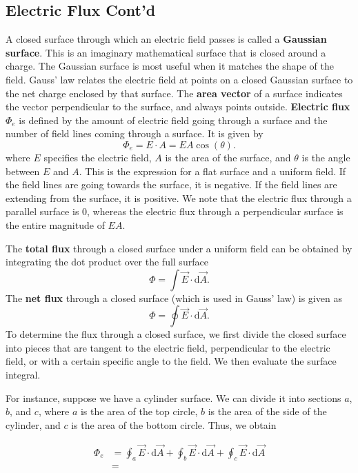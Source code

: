 \documentclass[11pt]{article}
\theoremstyle{plain} %
\theoremstyle{definition}
\theoremstyle{example}
\theoremstyle{remark}
\begin{document}
\subsection{Electric Flux Cont'd}



A closed surface through which an electric field passes is called a \textbf{Gaussian surface}. This is an imaginary mathematical surface that is closed around a charge. The Gaussian surface is most useful when it matches the shape of the field. Gauss' law relates the electric field at points on a closed Gaussian surface to the net charge enclosed by that surface. The \textbf{area vector} of a surface indicates the vector perpendicular to the surface, and always points outside. \textbf{Electric flux} $\Phi_e$ is defined by the amount of electric field going through a surface and the number of field lines coming through a surface. It is given by 
$$\Phi_e = E\cdot A = EA\cos(\theta).$$
where $E$ specifies the electric field, $A$ is the area of the surface, and $\theta$ is the angle between $E$ and $A$. This is the expression for a flat surface and a uniform field. If the field lines are going towards the surface, it is negative. If the field lines are extending from the surface, it is positive. We note that the electric flux through a parallel surface is $0$, whereas the electric flux through a perpendicular surface is the entire magnitude of $EA$. 

The \textbf{total flux} through a closed surface under a uniform field can be obtained by integrating the dot product over the full surface 
$$\Phi = \int\vec{E} \cdot \mathrm d \vec{A}.$$
The \textbf{net flux} through a closed surface (which is used in Gauss' law) is given as 
$$\Phi  = \oint \vec{E} \cdot \mathrm d \vec{A}.$$
To determine the flux through a closed surface, we first divide the closed surface into pieces that are tangent to the electric field, perpendicular to the electric field, or with a certain specific angle to the field. We then evaluate the surface integral. 

For instance, suppose we have a cylinder surface. We can divide it into sections $a$, $b$, and $c$, where $a$ is the area of the top circle, $b$ is the area of the side of the cylinder, and $c$ is the area of the bottom circle. Thus, we obtain 

\begin{align*}
\Phi_e &= \oint_a \vec{E} \cdot \mathrm d \vec{A} + \oint_b\vec{E} \cdot \mathrm d\vec{A} + \oint_c\vec{E} \cdot \mathrm d \vec{A} \\
&= 
\end{align*}
\end{document}
